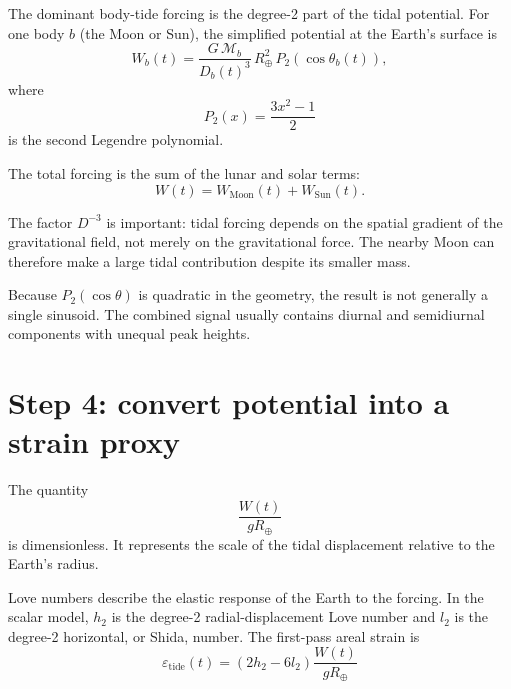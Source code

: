 \documentclass[11pt]{article}
\newcommand{\eps}{\varepsilon}
\newcommand{\Rearth}{R_{\oplus}}
\newcommand{\Mbody}{\mathcal{M}}
\begin{document}
The dominant body-tide forcing is the degree-2 part of the tidal potential.
For one body $b$ (the Moon or Sun), the simplified potential at the Earth’s
surface is
\begin{equation}
  W_b(t) =
  \frac{G\,\Mbody_b}{D_b(t)^3}\,\Rearth^2\,
  P_2\!\left(\cos\theta_b(t)\right),
  \label{eq:potential}
\end{equation}
where
\begin{equation}
  P_2(x) = \frac{3x^2-1}{2}
  \label{eq:legendre}
\end{equation}
is the second Legendre polynomial.

The total forcing is the sum of the lunar and solar terms:
\begin{equation}
  W(t) = W_{\mathrm{Moon}}(t) + W_{\mathrm{Sun}}(t).
  \label{eq:total_potential}
\end{equation}

The factor $D^{-3}$ is important: tidal forcing depends on the spatial
gradient of the gravitational field, not merely on the gravitational force.
The nearby Moon can therefore make a large tidal contribution despite its
smaller mass.

Because $P_2(\cos\theta)$ is quadratic in the geometry, the result is not
generally a single sinusoid.  The combined signal usually contains diurnal
and semidiurnal components with unequal peak heights.

\section{Step 4: convert potential into a strain proxy}

The quantity
\begin{equation}
  \frac{W(t)}{g\Rearth}
  \label{eq:dimensionless_forcing}
\end{equation}
is dimensionless.  It represents the scale of the tidal displacement relative
to the Earth’s radius.

Love numbers describe the elastic response of the Earth to the forcing.  In
the scalar model, $h_2$ is the degree-2 radial-displacement Love number and
$l_2$ is the degree-2 horizontal, or Shida, number.  The first-pass areal
strain is
\begin{equation}
  \boxed{
  \eps_{\mathrm{tide}}(t)
  = \left(2h_2-6l_2\right)\frac{W(t)}{g\Rearth}}
  \label{eq:areal_strain}
\end{equation}
\end{document}
